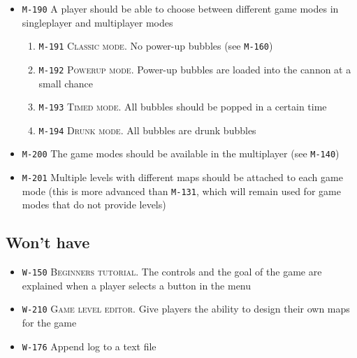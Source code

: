 \documentclass[a4paper]{article}
\begin{document}
\begin{itemize}
\item \texttt{M-190} A player should be able to choose between different game modes in singleplayer and multiplayer modes

        \begin{enumerate}
          \item \texttt{M-191} \textsc{Classic mode.} No power-up bubbles (see \texttt{M-160})
          \item \texttt{M-192} \textsc{Powerup mode.} Power-up bubbles are loaded into the cannon at a small chance
          \item \texttt{M-193} \textsc{Timed mode.} All bubbles should be popped in a certain time
          \item \texttt{M-194} \textsc{Drunk mode.} All bubbles are drunk bubbles
      \end{enumerate}     



\item \texttt{M-200} The game modes should be available in the multiplayer (see \texttt{M-140})
\item \texttt{M-201} Multiple levels with different maps should be attached to each game mode (this is more advanced than \texttt{M-131}, which will remain used for game modes that do not provide levels)


\end{itemize}

\subsection{Won't have}


\begin{itemize}
	\item \texttt{W-150} \textsc{Beginners tutorial.} The controls and the goal of the game are explained when a player selects a button in the menu
    \item \texttt{W-210} \textsc{Game level editor.} Give players the ability to design their own maps for the game
    \item \texttt{W-176} Append log to a text file
\end{itemize}
\end{document}
